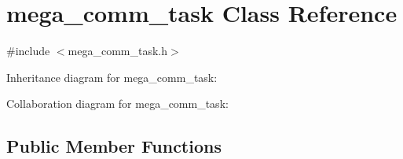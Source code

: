 \hypertarget{classmega__comm__task}{}\section{mega\+\_\+comm\+\_\+task Class Reference}
\label{classmega__comm__task}


{\ttfamily \#include $<$mega\+\_\+comm\+\_\+task.\+h$>$}



Inheritance diagram for mega\+\_\+comm\+\_\+task\+:


Collaboration diagram for mega\+\_\+comm\+\_\+task\+:
\subsection*{Public Member Functions}
